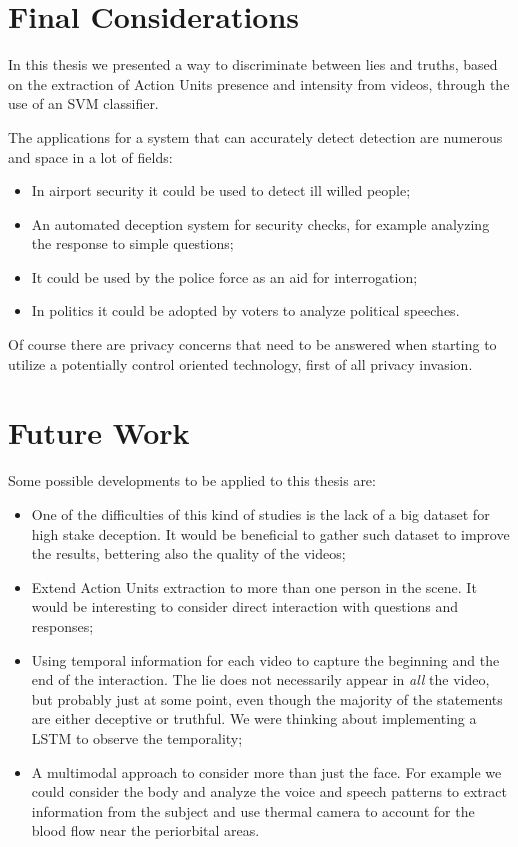 
\section{Final Considerations}
In this thesis we presented a way to discriminate between lies and truths, based on the extraction of Action Units presence and intensity from videos, through the use of an SVM classifier.

The applications for a system that can accurately detect detection are numerous and space in a lot of fields:
\begin{itemize}
	\item In airport security it could be used to detect ill willed people;
	\item An automated deception system for security checks, for example analyzing the response to simple questions;
	\item It could be used by the police force as an aid for interrogation;
	\item In politics it could be adopted by voters to analyze political speeches.
\end{itemize}
Of course there are privacy concerns that need to be answered when starting to utilize a potentially control oriented technology, first of all privacy invasion.

\section{Future Work} \label{fw}
Some possible developments to be applied to this thesis are:
\begin{itemize}
	\item One of the difficulties of this kind of studies is the lack of a big dataset for high stake deception. It would be beneficial to gather such dataset to improve the results, bettering also the quality of the videos;
	\item Extend Action Units extraction to more than one person in the scene. It would be interesting to consider direct interaction with questions and responses;
	\item Using temporal information for each video to capture the beginning and the end of the interaction. The lie does not necessarily appear in \textit{all} the video, but probably just at some point, even though the majority of the statements are either deceptive or truthful. We were thinking about implementing a LSTM to observe the temporality;
	\item A multimodal approach to consider more than just the face. For example we could consider the body and analyze the voice and speech patterns to extract information from the subject and use thermal camera to account for the blood flow near the periorbital areas.
\end{itemize}